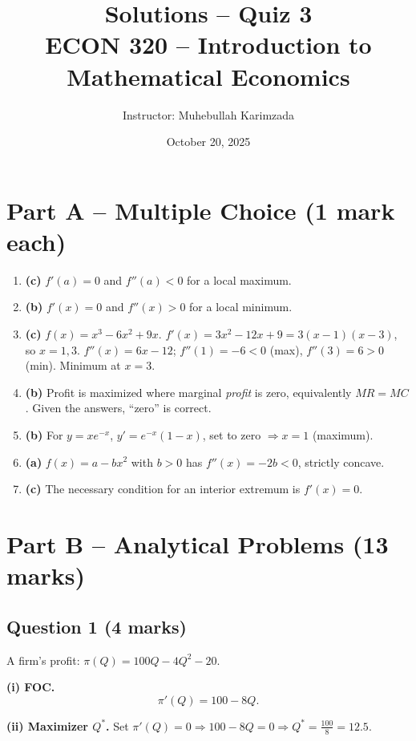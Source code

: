 \documentclass[12pt]{article}
\title{Solutions -- Quiz 3\\ \vspace{10pt}
\large ECON 320 -- Introduction to Mathematical Economics}
\author{Instructor: Muhebullah Karimzada}
\date{October 20, 2025}
\begin{document}
\maketitle


\section*{Part A – Multiple Choice (1 mark each)}

\begin{enumerate}
\item \textbf{(c)} $f'(a)=0$ and $f''(a)<0$ for a local maximum.

\item \textbf{(b)} $f'(x)=0$ and $f''(x)>0$ for a local minimum.

\item \textbf{(c)} $f(x)=x^3-6x^2+9x$. $f'(x)=3x^2-12x+9=3(x-1)(x-3)$, so $x=1,3$. $f''(x)=6x-12$; $f''(1)=-6<0$ (max), $f''(3)=6>0$ (min). Minimum at $x=3$.

\item \textbf{(b)} Profit is maximized where marginal \emph{profit} is zero, equivalently $MR=MC$. Given the answers, ``zero'' is correct.

\item \textbf{(b)} For $y=xe^{-x}$, $y'=e^{-x}(1-x)$, set to zero $\Rightarrow x=1$ (maximum).

\item \textbf{(a)} $f(x)=a-bx^2$ with $b>0$ has $f''(x)=-2b<0$, strictly concave.

\item \textbf{(c)} The necessary condition for an interior extremum is $f'(x)=0$.
\end{enumerate}



\section*{Part B – Analytical Problems (13 marks)}

\subsection*{Question 1 (4 marks)}
A firm’s profit: $\displaystyle \pi(Q)=100Q-4Q^2-20$.

\textbf{(i) FOC.} 
\[
\pi'(Q)=100-8Q.
\]

\textbf{(ii) Maximizer $Q^*$.} Set $\pi'(Q)=0 \Rightarrow 100-8Q=0 \Rightarrow Q^*=\frac{100}{8}=12.5$.
\end{document}
